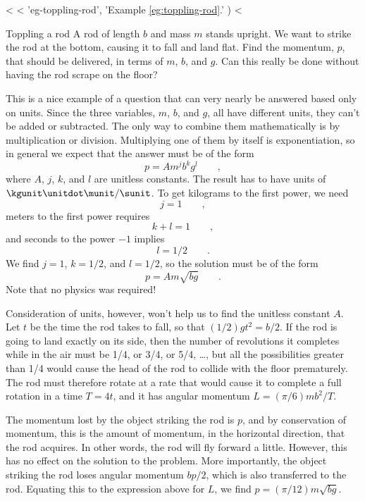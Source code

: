 <%
<%
    'eg-toppling-rod',
    'Example \ref{eg:toppling-rod}.'
  )
<%
\begin{eg}{Toppling a rod}\label{eg:toppling-rod}
\egquestion A rod of length $b$ and mass $m$ stands upright. We want
to strike the rod at the bottom, causing it to fall and land flat.
Find the momentum, $p$, that should be delivered, in terms of $m$, $b$,
and $g$. Can this really be done without having the rod scrape on the floor?

\eganswer This is a nice example of a question that can very nearly be
answered based only on units. Since the three variables, $m$, $b$,
and $g$, all have different units, they can't be added or subtracted.
The only way to combine them mathematically is by multiplication or division.
Multiplying one of them by itself is exponentiation, so in general
we expect that the answer must be of the form
\begin{equation*}
  p = A m^j b^k g^l \qquad ,
\end{equation*}
where $A$, $j$, $k$, and $l$ are unitless constants. The result has
to have units of $\kgunit\unitdot\munit/\sunit$. To get kilograms to
the first power, we need
\begin{equation*}
  j=1 \qquad ,
\end{equation*}
meters to the first power requires
\begin{equation*}
  k+l=1 \qquad ,
\end{equation*}
and
seconds to the power $-1$ implies
\begin{equation*}
  l=1/2 \qquad .
\end{equation*}
We find $j=1$, $k=1/2$, and $l=1/2$, so the solution must be of the form
\begin{equation*}
  p = A m\sqrt{bg} \qquad .
\end{equation*}
Note that no physics was required!

Consideration of units, however, won't help us to find the unitless constant
$A$. Let $t$ be the time the rod takes to fall, so that $(1/2)gt^2=b/2$.
If the rod is going to land exactly on its side, then the number of revolutions
it completes while in the air must be 1/4, or 3/4, or 5/4,  \ldots, but all the
possibilities greater than 1/4 would cause the head of the rod to collide with
the floor prematurely. The rod must therefore rotate at a rate that would
cause it to complete a full rotation in a time $T=4t$, and it has angular
momentum $L=(\pi/6)mb^2/T$.

The momentum lost by the object striking
the rod is $p$, and by conservation of momentum, this is the amount of
momentum, in the horizontal direction, that the rod acquires. In other words,
the rod will fly forward a little. However, this has no effect on the solution
to the problem. More importantly, the object striking the rod loses angular
momentum $bp/2$, which is also transferred to the rod. Equating this to the
expression above for $L$, we find $p=(\pi/12)m\sqrt{bg}$.


\end{eg}
